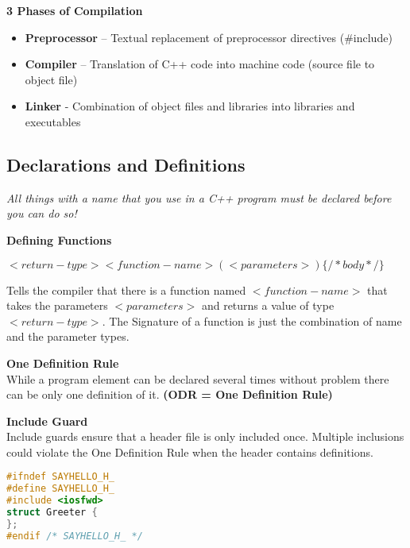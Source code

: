 \textbf{3 Phases of Compilation}
\begin{itemize}
  \itemsep -0.5em 
  \item \textbf{Preprocessor} – Textual replacement of preprocessor directives (\#include)
  \item \textbf{Compiler} – Translation of C++ code into machine code (source file to object file)
  \item \textbf{Linker} - Combination of object files and libraries into libraries and executables
\end{itemize}

\subsection{Declarations and Definitions}
\textit{All things with a name that you use in a C++ program must be declared before you can do so!}

\textbf{Defining Functions}
\begin{center}
$<return-type> <function-name> (<parameters>) \{ /* body */ \}$
\end{center}
 Tells the compiler that there is a function named $<function-name>$ that takes the parameters $<parameters>$ and returns a value of type $<return-type>$. The Signature of a function is just the combination of name and the parameter types. 
 
\textbf{One Definition Rule}\\ 
 While a program element can be declared several times without problem there can be only one definition of it. \textbf{(ODR = One Definition Rule)}
 
\textbf{Include Guard}\\
Include guards ensure that a header file is only included once. Multiple inclusions could violate the One Definition Rule when the header contains definitions.
\begin{lstlisting}[language=c++]
#ifndef SAYHELLO_H_
#define SAYHELLO_H_
#include <iosfwd>
struct Greeter {
};
#endif /* SAYHELLO_H_ */ 
\end{lstlisting}


